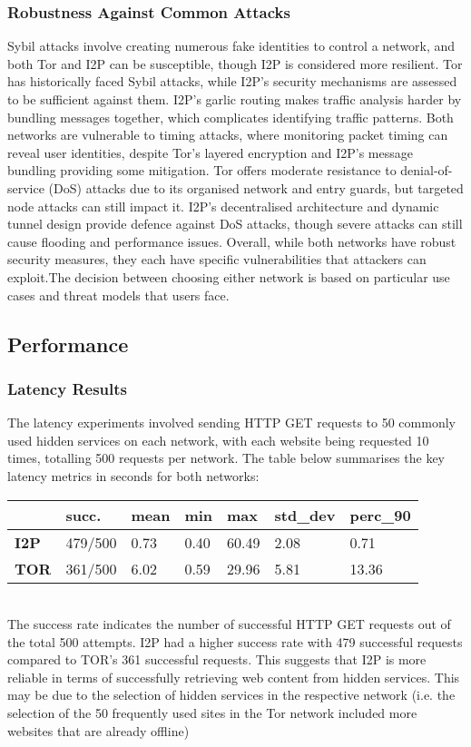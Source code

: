 \documentclass[12pt,conference]{IEEEtran}
\begin{document}
\subsubsection{Robustness Against Common Attacks}
Sybil attacks involve creating numerous fake identities to control a network, and both Tor and I2P can be susceptible, though I2P is considered more resilient. Tor has historically faced Sybil attacks, while I2P's security mechanisms are assessed to be sufficient against them. I2P's garlic routing makes traffic analysis harder by bundling messages together, which complicates identifying traffic patterns. Both networks are vulnerable to timing attacks, where monitoring packet timing can reveal user identities, despite Tor's layered encryption and I2P's message bundling providing some mitigation. Tor offers moderate resistance to denial-of-service (DoS) attacks due to its organised network and entry guards, but targeted node attacks can still impact it. I2P's decentralised architecture and dynamic tunnel design provide defence against DoS attacks, though severe attacks can still cause flooding and performance issues. Overall, while both networks have robust security measures, they each have specific vulnerabilities that attackers can exploit.The decision between choosing either network is based on particular use cases and threat models that users face.
\subsection{Performance}
\subsubsection{Latency Results}The latency experiments involved sending HTTP GET requests to 50 commonly used hidden services on each network, with each website being requested 10 times, totalling 500 requests per network. The table below summarises the key latency metrics in seconds for both networks:
\begin{table}[h]
\begin{tabular}{lllllll}
\textbf{}    & \textbf{succ.} & \textbf{mean} & \textbf{min} & \textbf{max} & \textbf{std\_dev} & \textbf{perc\_90} \\ \hline
\textbf{I2P} & 479/500        & 0.73          & 0.40         & 60.49        & 2.08              & 0.71              \\
\textbf{TOR} & 361/500        & 6.02          & 0.59         & 29.96        & 5.81              & 13.36            
\end{tabular}
\end{table}
\\
The success rate indicates the number of successful HTTP GET requests out of the total 500 attempts. I2P had a higher success rate with 479 successful requests compared to TOR's 361 successful requests. This suggests that I2P is more reliable in terms of successfully retrieving web content from hidden services. This may be due to the selection of hidden services in the respective network (i.e. the selection of the 50 frequently used sites in the Tor network included more websites that are already offline)
\end{document}
